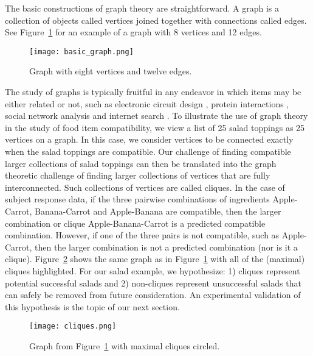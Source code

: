 The basic constructions of graph theory are straightforward.  A graph is a collection of objects called vertices \citep{Bollobaas1998} joined together with connections called edges.  See Figure~\ref{fig:exgraph} for an example of a graph with 8 vertices and 12 edges.  

\begin{figure}[h!]
\caption[Example graph.]{Graph with eight vertices and twelve edges.}
\centering
\texttt{[image: basic\_graph.png]}
\label{fig:exgraph}
\end{figure}

The study of graphs is typically fruitful in any endeavor in which items may be either related or not, such as electronic circuit design \citep{Bollobaas1998},  protein interactions \citep{Palla2005}, social network analysis \citep{Knoke2008} and internet search \citep{Brin1998}.  To illustrate the use of graph theory in the study of food item compatibility, we view a list of 25 salad toppings as 25 vertices on a graph.  In this case, we consider vertices to be connected exactly when the salad toppings are compatible.  Our challenge of finding compatible larger collections of salad toppings can then be translated into the graph theoretic challenge of finding larger collections of vertices that are fully interconnected.  Such collections of vertices are called cliques.  In the case of subject response data, if the three pairwise combinations of ingredients Apple-Carrot, Banana-Carrot and Apple-Banana are compatible, then the larger combination or clique Apple-Banana-Carrot is a predicted compatible combination.  However, if one of the three pairs is not compatible, such as Apple-Carrot, then the larger combination is not a predicted combination (nor is it a clique).  Figure~\ref{fig:exmaxclique} shows the same graph as in Figure~\ref{fig:exgraph} with all of the (maximal) cliques highlighted.  For our salad example, we hypothesize: 1) cliques represent potential successful salads and 2) non-cliques represent unsuccessful salads that can safely be removed from future consideration.  An experimental validation of this hypothesis is the topic of our next section.  

\begin{figure}[h!]
\caption[Example graph with maximal cliques]{Graph from Figure~\ref{fig:exgraph} with maximal cliques circled.}
\centering
\texttt{[image: cliques.png]}
\label{fig:exmaxclique}
\end{figure}

